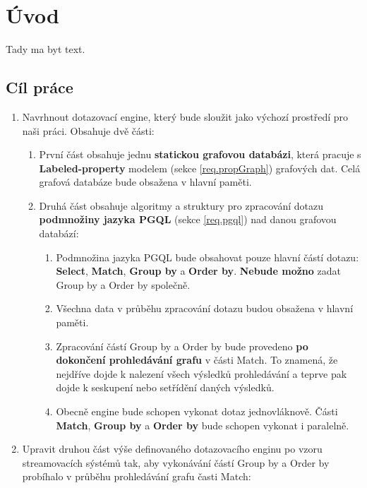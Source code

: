 \chapter*{Úvod}

Tady ma byt text.

\section*{Cíl práce}

\begin{enumerate}

\item
Navrhnout dotazovací engine, který bude sloužit jako výchozí prostředí pro naši práci.
Obsahuje dvě části:
\begin{enumerate}
\item První část obsahuje jednu \textbf{statickou grafovou databázi}, která pracuje s \textbf{Labeled-property} modelem (sekce \ref{req.propGraph}) grafových dat.
Celá grafová databáze bude obsažena v hlavní paměti.

\item Druhá část obsahuje algoritmy a struktury pro zpracování dotazu \textbf{podmnožiny jazyka PGQL} (sekce \ref{req.pgql}) nad danou grafovou databází:
    \begin{enumerate}
    \item Podmnožina jazyka PGQL bude obsahovat pouze hlavní částí dotazu: \textbf{Select}, \textbf{Match}, \textbf{Group by} a \textbf{Order by}.
    \textbf{Nebude možno} zadat Group by a Order by společně.
    \item Všechna data v průběhu zpracování dotazu budou obsažena v hlavní paměti.
    \item Zpracování částí Group by a Order by bude provedeno \textbf{po dokončení prohledávání grafu} v části Match.
    To znamená, že nejdříve dojde k nalezení všech výsledků prohledávání a teprve pak dojde k seskupení nebo setřídění daných výsledků.
    \item Obecně engine bude schopen vykonat dotaz jednovláknově.
    Části \textbf{Match}, \textbf{Group by} a \textbf{Order by} bude schopen vykonat i paralelně.
    \end{enumerate}
\end{enumerate}

\item
Upravit druhou část výše definovaného dotazovacího enginu po vzoru streamovacích sýstémů tak, aby vykonávání částí Group by a Order by probíhalo v průběhu prohledávání grafu časti Match:
\begin{enumerate}


\end{enumerate}
\end{enumerate}
